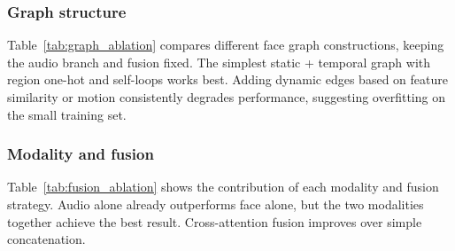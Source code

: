 \documentclass[conference]{IEEEtran}
\begin{document}
\subsubsection{Graph structure}

Table~\ref{tab:graph_ablation} compares different face graph constructions, keeping the audio branch and fusion fixed.
The simplest static + temporal graph with region one-hot and self-loops works best.
Adding dynamic edges based on feature similarity or motion consistently degrades performance, suggesting overfitting on the small training set.

\begin{table}[t]
\centering
\caption{Ablation on face graph structure. ``Static'' and ``Temp'' denote anatomical and temporal edges; ``Dyn'' denotes dynamic edges; ``Region'' adds a facial-region one-hot and self-loops.}
\label{tab:graph_ablation}
\footnotesize
{}
\end{table}

\subsubsection{Modality and fusion}

Table~\ref{tab:fusion_ablation} shows the contribution of each modality and fusion strategy.
Audio alone already outperforms face alone, but the two modalities together achieve the best result.
Cross-attention fusion improves over simple concatenation.

\begin{table}[t]
\centering
\caption{Ablation on modalities and fusion.}
\label{tab:fusion_ablation}
\footnotesize
{}
\end{table}
\end{document}

